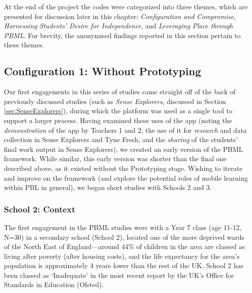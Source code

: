 At the end of the project the codes were categorized into three themes, which are presented for discussion later in this chapter: \textit{Configuration and Compromise}, \textit{Harnessing Students' Desire for Independence}, and \textit{Leveraging Place through PBML}. For brevity, the anonymised findings reported in this section pertain to these themes.

\subsection{Configuration 1: Without Prototyping}

Our first engagements in this series of studies came straight off of the back of previously discussed studies (such as \textit{Sense Explorers}, discussed in Section \ref{sec:SenseExplorers}), during which the platform was used as a single tool to support a larger process. Having examined these uses of the app (noting the \textit{demonstration} of the app by Teachers 1 and 2, the use of it for \textit{research} and data collection in Sense Explorers and Tyne Fresh, and the \textit{sharing} of the students' final work output in Sense Explorers), we created an early version of the PBML framework. While similar, this early version was shorter than the final one described above, as it existed without the Prototyping stage. Wishing to iterate and improve on the framework (and explore the potential roles of mobile learning within PBL in general), we began short studies with Schools 2 and 3.

\subsubsection{School 2: Context}

The first engagement in the PBML studies were with a Year 7 class (age 11-12, N=30) in a secondary school (School 2), located one of the more deprived wards of the North East of England---around 44\% of children in the area are classed as living after poverty (after housing costs), and the life expectancy for the area's population is approximately 4 years lower than the rest of the UK. School 2 has been classed as `Inadequate' in the most recent report by the UK's Office for Standards in Education (Ofsted).

